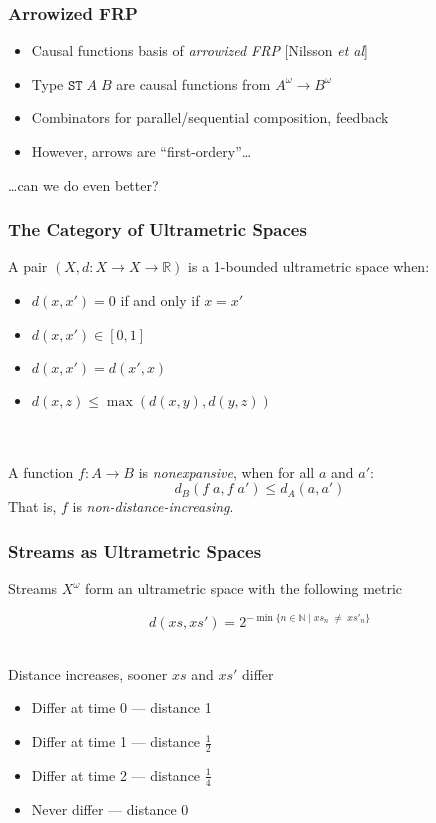 \documentclass{beamer}
\begin{document}
\begin{frame}
  \frametitle{Arrowized FRP}

  \begin{itemize}
    \item Causal functions basis of \emph{arrowized FRP} [Nilsson \emph{et al}]\pause  
    \item Type $\mathtt{ST}\;A\;B$ are causal functions from $A^\omega \to B^\omega$ \pause
    \item Combinators for parallel/sequential composition, feedback \pause
    \item However, arrows are ``first-ordery''\ldots \pause
  \end{itemize}

  \ldots can we do even better?
\end{frame}

\begin{frame}
  \frametitle{The Category of Ultrametric Spaces}

  A pair $(X, d : X \to X \to \mathbb{R})$ is a 1-bounded ultrametric space when:

  \begin{itemize}
    \item $d(x, x') = 0$ if and only if $x = x'$
    \item $d(x, x') \in [0,1]$ 
    \item $d(x, x') = d(x', x)$
    \item $d(x, z) \leq \max(d(x,y), d(y, z))$
  \end{itemize}
  \pause
  \ \\
  \ \\
  A function $f : A \to B$ is \emph{nonexpansive}, when for all $a$ and $a'$:
    \begin{displaymath}
      d_B(f\;a, f\;a') \leq d_A(a, a')
    \end{displaymath}
  That is, $f$ is \emph{non-distance-increasing}. 
\end{frame}

\begin{frame}
  \frametitle{Streams as Ultrametric Spaces}

  Streams $X^\omega$ form an ultrametric space with the following metric

  \begin{displaymath}
    d(xs, xs') = 2^{-\min \{n \in \mathbb{N} \;|\; xs_n \;\not=\; xs'_n \}}
  \end{displaymath}

  \ \\
  Distance increases, sooner $xs$ and $xs'$ differ
  \begin{itemize}
    \item Differ at time 0 --- distance 1
    \item Differ at time 1 --- distance $\frac{1}{2}$
    \item Differ at time 2 --- distance $\frac{1}{4}$
    \item Never differ --- distance 0
 \end{itemize}
\end{frame}
\end{document}
